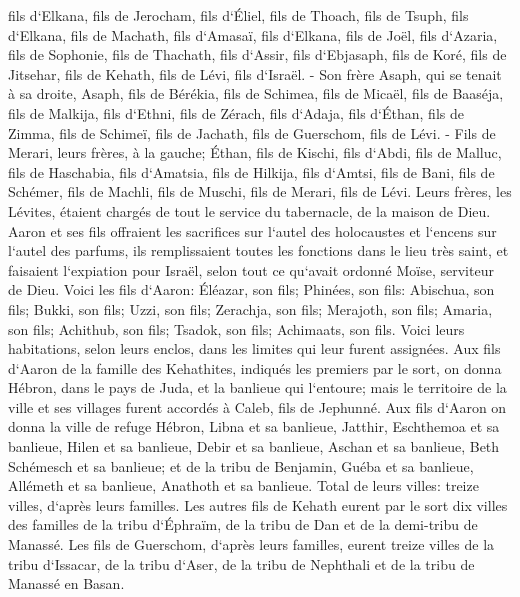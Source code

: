 \verse fils d`Elkana, fils de Jerocham, fils d`Éliel, fils de Thoach, 
\verse fils de Tsuph, fils d`Elkana, fils de Machath, fils d`Amasaï, 
\verse fils d`Elkana, fils de Joël, fils d`Azaria, fils de Sophonie, 
\verse fils de Thachath, fils d`Assir, fils d`Ebjasaph, fils de Koré, 
\verse fils de Jitsehar, fils de Kehath, fils de Lévi, fils d`Israël. - 
\verse Son frère Asaph, qui se tenait à sa droite, Asaph, fils de Bérékia, fils de Schimea, 
\verse fils de Micaël, fils de Baaséja, fils de Malkija, 
\verse fils d`Ethni, fils de Zérach, fils d`Adaja, 
\verse fils d`Éthan, fils de Zimma, fils de Schimeï, 
\verse fils de Jachath, fils de Guerschom, fils de Lévi. - 
\verse Fils de Merari, leurs frères, à la gauche; Éthan, fils de Kischi, fils d`Abdi, fils de Malluc, 
\verse fils de Haschabia, fils d`Amatsia, fils de Hilkija, 
\verse fils d`Amtsi, fils de Bani, fils de Schémer, 
\verse fils de Machli, fils de Muschi, fils de Merari, fils de Lévi. 
\verse Leurs frères, les Lévites, étaient chargés de tout le service du tabernacle, de la maison de Dieu. 
\verse Aaron et ses fils offraient les sacrifices sur l`autel des holocaustes et l`encens sur l`autel des parfums, ils remplissaient toutes les fonctions dans le lieu très saint, et faisaient l`expiation pour Israël, selon tout ce qu`avait ordonné Moïse, serviteur de Dieu. 
\verse Voici les fils d`Aaron: Éléazar, son fils; Phinées, son fils: Abischua, son fils; 
\verse Bukki, son fils; Uzzi, son fils; Zerachja, son fils; 
\verse Merajoth, son fils; Amaria, son fils; Achithub, son fils; 
\verse Tsadok, son fils; Achimaats, son fils. 
\verse Voici leurs habitations, selon leurs enclos, dans les limites qui leur furent assignées. Aux fils d`Aaron de la famille des Kehathites, indiqués les premiers par le sort, 
\verse on donna Hébron, dans le pays de Juda, et la banlieue qui l`entoure; 
\verse mais le territoire de la ville et ses villages furent accordés à Caleb, fils de Jephunné. 
\verse Aux fils d`Aaron on donna la ville de refuge Hébron, Libna et sa banlieue, Jatthir, Eschthemoa et sa banlieue, 
\verse Hilen et sa banlieue, Debir et sa banlieue, 
\verse Aschan et sa banlieue, Beth Schémesch et sa banlieue; 
\verse et de la tribu de Benjamin, Guéba et sa banlieue, Allémeth et sa banlieue, Anathoth et sa banlieue. Total de leurs villes: treize villes, d`après leurs familles. 
\verse Les autres fils de Kehath eurent par le sort dix villes des familles de la tribu d`Éphraïm, de la tribu de Dan et de la demi-tribu de Manassé. 
\verse Les fils de Guerschom, d`après leurs familles, eurent treize villes de la tribu d`Issacar, de la tribu d`Aser, de la tribu de Nephthali et de la tribu de Manassé en Basan. 
